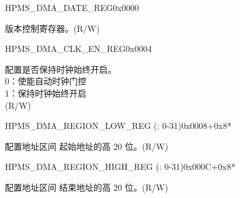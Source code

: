 \begin{register}{H}{PMS\_DMA\_DATE\_REG}{0x0000}\label{regdesc:PMSDMADATEREG}
%
\regnewline%
\begin{regdesc}\begin{reglist}
\label{fielddesc:PMSDMADATE}\item [PMS\_DMA\_DATE] 版本控制寄存器。(R/W)
\end{reglist}\end{regdesc}
\end{register}


\begin{register}{H}{PMS\_DMA\_CLK\_EN\_REG}{0x0004}\label{regdesc:PMSDMACLKENREG}
%
%
\regnewline%
\begin{regdesc}\begin{reglist}
\label{fielddesc:PMSDMACLKEN}\item [PMS\_DMA\_CLK\_EN] 配置是否保持时钟始终开启。\\
0：使能自动时钟门控 \\
1：保持时钟始终开启 \\
(R/W)
\end{reglist}\end{regdesc}
\end{register}


\begin{register}{H}{PMS\_DMA\_REGION\_LOW\_REG (: 0-31)}{0x0008+0x8*}\label{regdesc:PMSDMAREGIONNLOWREG}
%
%
\regnewline%
\begin{regdesc}\begin{reglist}
\label{fielddesc:PMSDMAREGIONNLOW}\item [PMS\_DMA\_REGION\regindex{n}\_LOW] 配置地址区间  起始地址的高 20 位。(R/W)
\end{reglist}\end{regdesc}
\end{register}


\begin{register}{H}{PMS\_DMA\_REGION\_HIGH\_REG (: 0-31)}{0x000C+0x8*}\label{regdesc:PMSDMAREGIONNHIGHREG}
%
%
\regnewline%
\begin{regdesc}\begin{reglist}
\label{fielddesc:PMSDMAREGIONNHIGH}\item [PMS\_DMA\_REGION\regindex{n}\_HIGH] 配置地址区间  结束地址的高 20 位。(R/W)
\end{reglist}\end{regdesc}
\end{register}


